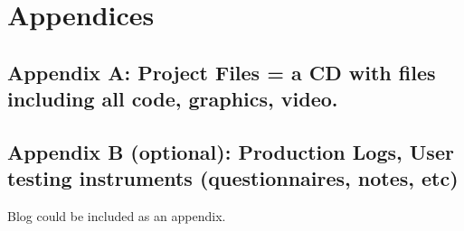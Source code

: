 \chapter{Appendices}
\section{Appendix A: Project Files = a CD with files including all code, graphics, video.}

\section{Appendix B (optional): Production Logs, User testing instruments (questionnaires, notes, etc)}
Blog could be included as an appendix.